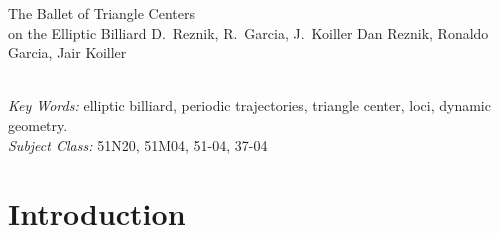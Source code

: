 \documentclass[12pt,twoside]{article}
\begin{document}
\begin{JGGarticle}
   {The Ballet of Triangle Centers\\on the Elliptic Billiard}
   {D.\ Reznik, R.\ Garcia, J.\ Koiller}
   {Dan Reznik, Ronaldo Garcia, Jair Koiller}
   {
    }
   \begin{JGGabstract}
        
        \\[1mm]{\em Key Words:} elliptic billiard, periodic trajectories, triangle center, loci, dynamic geometry.
        \\[1mm]{\em Subject Class:} 51N20, 51M04, 51-04, 37-04
   \end{JGGabstract}
                





%


\section{Introduction}
\label{sec:intro}



\end{JGGarticle}
\end{document}
